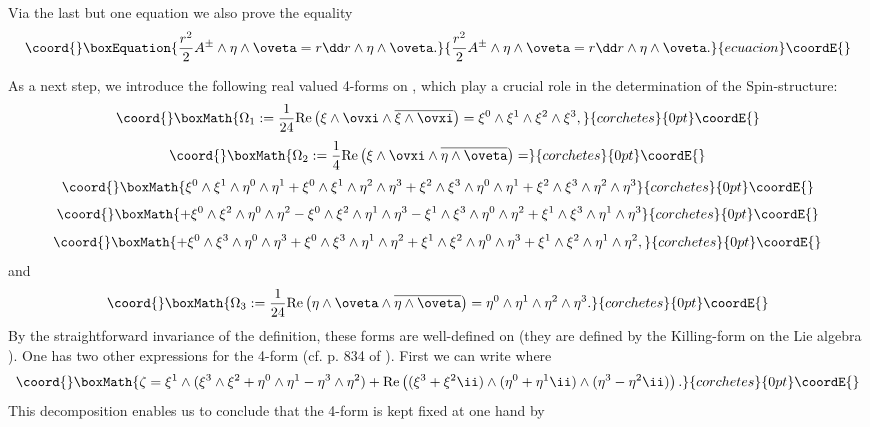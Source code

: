 \documentclass[a4paper,12pt,draft]{article}
\begin{document}
Via the last but one equation we also prove the equality
\begin{equation}\coord{}\boxEquation{
{r^2\over 2}A^\pm\wedge\eta\wedge\oveta =r\dd r\wedge 
\eta\wedge\oveta . 
\label{rkifejezes}
}{
{r^2\over 2}A^\pm\wedge\eta\wedge\oveta =r\dd r\wedge 
\eta\wedge\oveta . 
}{ecuacion}\coordE{}\end{equation}

As a next step, we introduce the following real valued 4-forms on
\coordHE{}, which play a crucial role in the determination of the
Spin\coordHE{}-structure:
\[\coord{}\boxMath{\Omega_1:={1\over 24}{\rm Re}\left(\xi\wedge\ovxi\wedge
\overline{\xi\wedge\ovxi}\right) 
=\xi^0\wedge\xi^1\wedge\xi^2\wedge\xi^3,}{corchetes}{0pt}\coordE{}\]
\[\coord{}\boxMath{\Omega_2:={1\over 4}{\rm
Re}\left(\xi\wedge\ovxi\wedge\overline{\eta\wedge\oveta}\right) =}{corchetes}{0pt}\coordE{}\]
\[\coord{}\boxMath{\xi^0\wedge\xi^1\wedge\eta^0\wedge\eta^1+\xi^0\wedge\xi^1\wedge\eta^2
\wedge\eta^3 +\xi^2\wedge\xi^3\wedge\eta^0\wedge\eta^1+\xi^2\wedge\xi^3
\wedge\eta^2\wedge\eta^3}{corchetes}{0pt}\coordE{}\]
\[\coord{}\boxMath{+\xi^0\wedge\xi^2\wedge\eta^0\wedge\eta^2-\xi^0\wedge\xi^2\wedge
\eta^1\wedge\eta^3-\xi^1\wedge\xi^3\wedge\eta^0\wedge\eta^2+\xi^1\wedge
\xi^3\wedge\eta^1\wedge\eta^3}{corchetes}{0pt}\coordE{}\]
\[\coord{}\boxMath{+\xi^0\wedge\xi^3\wedge\eta^0\wedge\eta^3+\xi^0\wedge\xi^3\wedge\eta^1
\wedge\eta^2+\xi^1\wedge\xi^2\wedge\eta^0\wedge\eta^3+\xi^1\wedge
\xi^2\wedge\eta^1\wedge\eta^2,}{corchetes}{0pt}\coordE{}\]
and
\[\coord{}\boxMath{\Omega_3:={1\over 24}{\rm 
Re}\left(\eta\wedge\oveta\wedge\overline{\eta\wedge\oveta}\right) 
=\eta^0\wedge\eta^1\wedge\eta^2\wedge\eta^3.}{corchetes}{0pt}\coordE{}\]
By the straightforward invariance of the definition, these forms are
well-defined on \coordHE{} (they are defined by the Killing-form 
\coordHE{} on the Lie algebra
\coordHE{}). One has two other expressions for the
4-form \coordHE{} (cf. p. 834 of
\cite{bry-sal}). First
we can write \coordHE{} where
\[\coord{}\boxMath{\zeta =\xi^1\wedge
(\xi^3\wedge\xi^2+\eta^0\wedge\eta^1-\eta^3\wedge\eta^2)+{\rm
Re}\left(
(\xi^3+\xi^2\ii )\wedge (\eta^0+\eta^1\ii )\wedge (\eta^3-\eta^2\ii
)\right) .}{corchetes}{0pt}\coordE{}\] 
This decomposition enables us to conclude
that the 4-form \coordHE{} is kept fixed at one hand by
\end{document}
